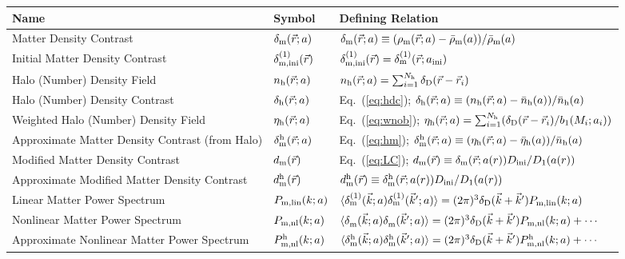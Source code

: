 \documentclass[prd,amsmath,amssymb,floatfix,superscriptaddress,nofootinbib,twocolumn]{revtex4-1}
\newcommand{\ini}{\rm ini}
\newcommand{\vrr}{\vec{r}}
\newcommand{\vk}{\vec{k}}
\newcommand{\ec}[1]{Eq.~(\ref{eq:#1})}
\newcommand\dmh{\delta_{\rm m}^{\rm h}}
\begin{document}
\begin{table}[h!]\label{tb}
\centering
\begin{tabular}{ |p{7.5cm}||p{1.7 cm}|p{7.7cm}|  }
 \hline
Name & Symbol &Defining Relation\\
 \hline
 \hline
 Matter Density Contrast   & $\delta_{\rm m}(\vrr;a)$    & $\delta_{\rm m}(\vrr;a)\equiv (\rho_{\rm m}(\vrr;a)-\bar{\rho}_{\rm m}(a))/{\bar{\rho}_{\rm m}(a)}$\\
 Initial Matter Density Contrast   & $\delta^{(1)}_{\rm m,ini}(\vrr)$    & $\delta^{(1)}_{\rm m,ini}(\vrr)= \delta^{(1)}_{\rm m}(\vrr;a_{\ini})$\\
  Halo (Number) Density Field & $n_{\rm h}(\vrr;a)$ & $n_{\rm h}(\vrr;a)=\sum_{i=1}^{N_{\rm h}}\delta_{\rm D}(\vrr-\vrr_{i})$\\
 Halo (Number) Density Contrast &   $\delta_{\rm h}(\vrr;a)$  &  \ec{hdc}; $\delta_{\rm h}(\vrr;a)\equiv (n_{\rm h}(\vrr;a)-\bar{n}_{\rm h}(a))/{\bar{n}_{\rm h}(a)}$ \\
 Weighted Halo (Number) Density Field & $\eta_{\rm h}(\vrr;a)$ & \ec{wnob}; $\eta_{\rm h}(\vrr;a)=\sum_{i=1}^{N_{\rm h}}(\delta_{\rm D}(\vrr-\vrr_{i})/b_{1}(M_{i};a_{i}))$\\
 Approximate Matter Density Contrast (from Halo)  & $\delta_{\rm m}^{\rm h}(\vrr;a)$ & \ec{hm}; $\dmh(\vrr;a) \equiv {(\eta_{\rm h}(\vrr;a)-\bar{\eta}_{\rm h}(a))}/{\bar{n}_{\rm h}(a)}$\\
  \hline
 Modified Matter Density Contrast &   $d_{\rm m}(\vrr)$ & \ec{LC}; $d_{\rm m}(\vrr) \equiv \delta_{\rm m}(\vrr;a(r)) {D_{\ini}}/{D_{1}(a(r))} $\\
 Approximate Modified Matter Density Contrast& $d_{\rm m}^{\rm h}(\vrr)$  & $d_{\rm m}^{\rm h}(\vrr) \equiv \delta_{\rm m}^{\rm h}(\vrr;a(r)) {D_{\ini}}/{D_{1}(a(r))} $  \\
 \hline
 Linear Matter Power Spectrum &$P_{\rm m,lin}(k;a)$ & $\langle \delta^{(\rm 1)}_{\rm m}(\vk;a) \delta^{(\rm 1)}_{\rm m}(\vk';a) \rangle = (2\pi)^3 \delta_{\rm D}(\vk+\vk')P_{\rm m,lin}(k;a)$\\
 Nonlinear Matter Power Spectrum &$P_{\rm m,nl}(k;a)$ & $\langle \delta^{}_{\rm m}(\vk;a) \delta^{}_{\rm m}(\vk';a) \rangle = (2\pi)^3 \delta_{\rm D}(\vk+\vk')P_{\rm m,nl}(k;a)+\cdots$\\
 Approximate Nonlinear Matter Power Spectrum &$P^{\rm h}_{\rm m,nl}(k;a)$ & $\langle \delta^{\rm h}_{\rm m}(\vk;a) \delta^{\rm h}_{\rm m}(\vk';a) \rangle = (2\pi)^3 \delta_{\rm D}(\vk+\vk')P^{\rm h}_{\rm m,nl}(k;a)+\cdots$\\

\end{tabular}
\end{table}
\end{document}
